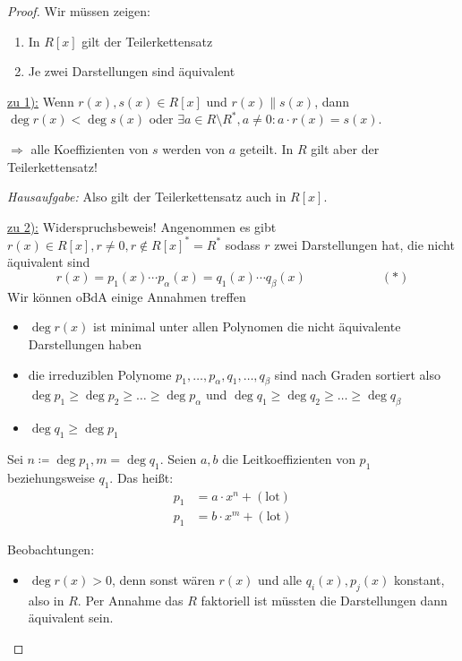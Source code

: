 \documentclass[a4paper,12pt,numbers=noenddot,parskip=full]{scrartcl}
\newcommand{\heading}{\underline}
\theoremstyle{dotless}
\theoremstyle{remark}
\begin{document}
	\begin{proof}
		Wir müssen zeigen:
		\begin{enumerate}
			\item In $R[x]$ gilt der Teilerkettensatz
			\item Je zwei Darstellungen sind äquivalent
		\end{enumerate}
	
		\heading{zu 1):} Wenn $r(x),s(x) \in R[x]$ und $r(x) \parallel s(x)$, dann $\deg r(x) < \deg s(x)$ oder $\exists a \in R \setminus R^*, a \neq 0: a \cdot r(x) = s(x)$.
		
		$\Rightarrow$ alle Koeffizienten von $s$ werden von $a$ geteilt. In $R$ gilt aber der Teilerkettensatz!
		
		\textit{Hausaufgabe:} Also gilt der Teilerkettensatz auch in $R[x]$.
		
		\heading{zu 2):} Widerspruchsbeweis! Angenommen es gibt $r(x) \in R[x], r \neq 0, r \notin R[x]^* = R^*$ sodass $r$ zwei Darstellungen hat, die nicht äquivalent sind
		\begin{equation*}
			r(x) = p_1(x) \cdots p_\alpha(x) = q_1(x) \cdots q_\beta(x) \qquad\qquad\qquad (*)
		\end{equation*}
		Wir können oBdA einige Annahmen treffen
		\begin{itemize}
			\item $\deg r(x)$ ist minimal unter allen Polynomen die nicht äquivalente Darstellungen haben
			\item die irreduziblen Polynome $p_1, \dots, p_\alpha, q_1, \dots, q_\beta$ sind nach Graden sortiert also $\deg p_1 \geq \deg p_2 \geq \dots \geq \deg p_\alpha$ und $\deg q_1 \geq \deg q_2 \geq \dots \geq \deg q_\beta$
			\item $\deg q_1 \geq \deg p_1$
		\end{itemize}
	
		Sei $n \coloneqq \deg p_1, m = \deg q_1$. Seien $a,b$ die Leitkoeffizienten von $p_1$ beziehungsweise $q_1$. Das heißt:
		\begin{align*}
			p_1 &= a \cdot x^n + (\text{lot}) \\
			p_1 &= b \cdot x^m + (\text{lot})
		\end{align*}
		
		Beobachtungen:
		\begin{itemize}
			\item $\deg r(x) > 0$, denn sonst wären $r(x)$ und alle $q_i(x), p_j(x)$ konstant, also in $R$. Per Annahme das $R$ faktoriell ist müssten die Darstellungen dann äquivalent sein.
			

\end{itemize}
\end{proof}
\end{document}
